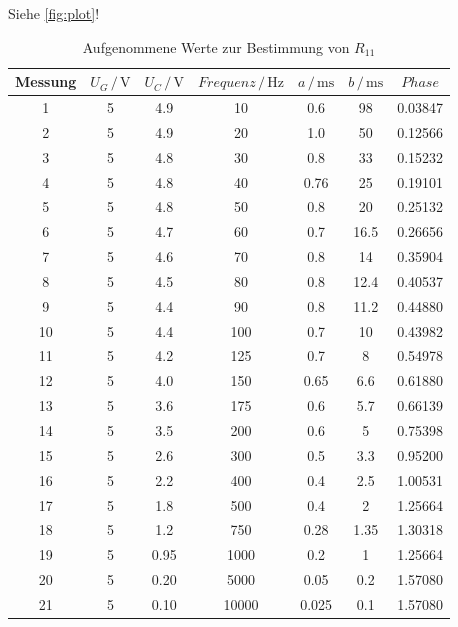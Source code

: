 Siehe \autoref{fig:plot}!

\begin{table}[H]
\normalsize

\centering
{}
\begin{tabular}{c c c c c c c}
\toprule
        Messung & $U_G \,/\,\si{\volt}$ & $U_C \,/\,\si{\volt}$ & $Frequenz \,/\,\si{\hertz}$ & $a\,/\, \si{\milli\second}$ & $b\,/\, \si{\milli\second}$ & $Phase$ \\
        \midrule
        1   & 5 & 4.9 & 10 & 0.6 & 98 &     0.03847 \\
        2   & 5 & 4.9 & 20 & 1.0 & 50 &     0.12566 \\
        3   & 5 & 4.8 & 30  & 0.8 & 33 &    0.15232 \\ 
        4   & 5 & 4.8 & 40 & 0.76 & 25 &    0.19101 \\
        5   & 5 & 4.8 & 50 & 0.8 & 20 &     0.25132 \\
        6   & 5 & 4.7 & 60 & 0.7 & 16.5 &   0.26656 \\
        7   & 5 & 4.6 & 70 & 0.8 & 14 &     0.35904 \\
        8   & 5 & 4.5 & 80 & 0.8 & 12.4 &   0.40537 \\
        9   & 5 & 4.4 & 90 & 0.8 & 11.2 &   0.44880 \\
        10  & 5 & 4.4 & 100 & 0.7 & 10 &    0.43982 \\
        11  & 5 & 4.2 & 125 & 0.7 & 8 &     0.54978 \\
        12  & 5 & 4.0 & 150 & 0.65 & 6.6 &  0.61880 \\
        13  & 5 & 3.6 & 175 & 0.6 & 5.7 &   0.66139 \\
        14  & 5 & 3.5 & 200 & 0.6 & 5 &     0.75398 \\
        15  & 5 & 2.6 & 300 & 0.5 & 3.3 &   0.95200 \\
        16  & 5 & 2.2 & 400 & 0.4 & 2.5 &   1.00531 \\
        17  & 5 & 1.8 & 500 & 0.4 & 2 &     1.25664 \\
        18  & 5 & 1.2 & 750 & 0.28 & 1.35 & 1.30318 \\
        19  & 5 & 0.95 & 1000 & 0.2 & 1 &   1.25664 \\
        20  & 5 & 0.20 & 5000 & 0.05 & 0.2 & 1.57080 \\
        21  & 5 & 0.10& 10000 & 0.025 & 0.1 & 1.57080 \\



        
\bottomrule

\end{tabular}

\caption{Aufgenommene Werte zur Bestimmung von $R_{11}$}
\label{tab:2}
\end{table}